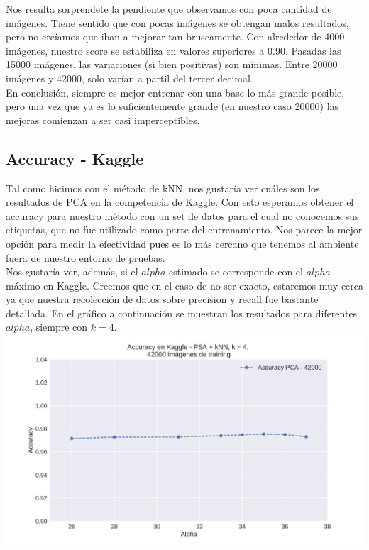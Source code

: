 Nos resulta sorprendete la pendiente que observamos con poca cantidad de imágenes. Tiene sentido que con pocas imágenes se obtengan malos resultados, pero no creíamos que iban a mejorar tan bruscamente. Con alrededor de 4000 imágenes, nuestro score se estabiliza en valores superiores a 0.90. Pasadas las 15000 imágenes, las variaciones (si bien positivas) son mínimas. Entre 20000 imágenes y 42000, solo varían a partil del tercer decimal. \\

En conclusión, siempre es mejor entrenar con una base lo más grande posible, pero una vez que ya es lo suficientemente grande (en nuestro caso 20000) las mejoras comienzan a ser casi imperceptibles. \\

\subsection{Accuracy - Kaggle}

Tal como hicimos con el método de kNN, nos gustaría ver cuáles son los resultados de PCA en la competencia de Kaggle. Con esto esperamos obtener el accuracy para nuestro método con un set de datos para el cual no conocemos sus etiquetas, que no fue utilizado como parte del entrenamiento. Nos parece la mejor opción para medir la efectividad pues es lo más cercano que tenemos al ambiente fuera de nuestro entorno de pruebas. \\

Nos gustaría ver, además, si el $alpha$ estimado se corresponde con el $alpha$ máximo en Kaggle. Creemos que en el caso de no ser exacto, estaremos muy cerca ya que nuestra recolección de datos sobre precision y recall fue bastante detallada. En el gráfico a continuación se muestran los resultados para diferentes $alpha$, siempre con $k=4$. \\

{\centering
    \includegraphics[scale=0.60]{informe/imagenes/pca/clasificacionKaggle.pdf} \\
}
$ $\newline

